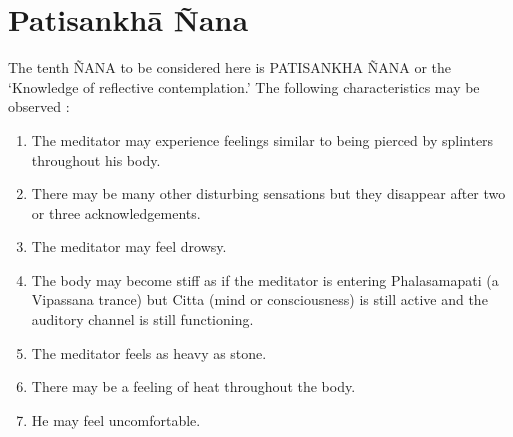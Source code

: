 \documentclass[a5paper,10pt,english]{book}
\begin{document}
\section{Patisankhā Ñana}
\label{\detokenize{progress:patisankha-nana}}
\sphinxAtStartPar
The tenth ÑANA to be considered here is PATISANKHA ÑANA or the ‘Knowledge of reflective contemplation.’ The following characteristics may be observed :\sphinxhyphen{}
\begin{enumerate}
%
\item {} 
\sphinxAtStartPar
The meditator may experience feelings similar to being pierced by splinters throughout his body.

\item {} 
\sphinxAtStartPar
There may be many other disturbing sensations but they disappear after two or three acknowledgements.

\item {} 
\sphinxAtStartPar
The meditator may feel drowsy.

\item {} 
\sphinxAtStartPar
The body may become stiff as if the meditator is entering Phalasamapati (a Vipassana trance) but Citta (mind or consciousness) is still active and the auditory channel is still functioning.

\item {} 
\sphinxAtStartPar
The meditator feels as heavy as stone.

\item {} 
\sphinxAtStartPar
There may be a feeling of heat throughout the body.

\item {} 
\sphinxAtStartPar
He may feel uncomfortable.

\end{enumerate}
\end{document}
